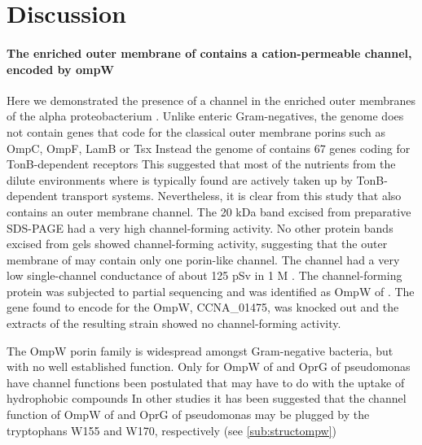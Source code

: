 \section{Discussion}
\label{sec:porin-discussion}

\paragraph{The enriched outer membrane of \caulobacter contains a cation-permeable channel, encoded by ompW}
Here we demonstrated the presence of a channel in the enriched outer membranes of the alpha proteobacterium \caulobacter. Unlike enteric Gram-negatives, the genome does not contain genes that code for the classical outer membrane porins such as OmpC, OmpF, LamB or Tsx Instead the genome of \caulobacter contains 67 genes coding for TonB-dependent receptors This suggested that most of the nutrients from the dilute environments where \caulobacter is typically found are actively taken up by TonB-dependent transport systems. Nevertheless, it is clear from this study that \caulobacter also contains an outer membrane channel. The 20 kDa band excised from preparative \ac{SDS-PAGE} had a very high channel-forming activity. No other protein bands excised from gels showed channel-forming activity, suggesting that the outer membrane of \caulobacter may contain only one porin-like channel. The channel had a very low single-channel conductance of about 125 \si{\pico\sievert} in 1 M . The channel-forming protein was subjected to partial sequencing and was identified as OmpW of \caulobacter. The gene found to encode for the OmpW, CCNA\_01475, was knocked out and the extracts of the resulting strain showed no channel-forming activity.

 The OmpW porin family is widespread amongst Gram-negative bacteria, but with no well established function. Only for OmpW of \ecoli and OprG of \ac{pseudomonas} have channel functions been postulated that may have to do with the uptake of hydrophobic compounds In other studies it has been suggested that the channel function of OmpW of \ecoli and OprG of \ac{pseudomonas} may be plugged by  the tryptophans W155 and W170, respectively (see \cref{sub:structompw}) 

